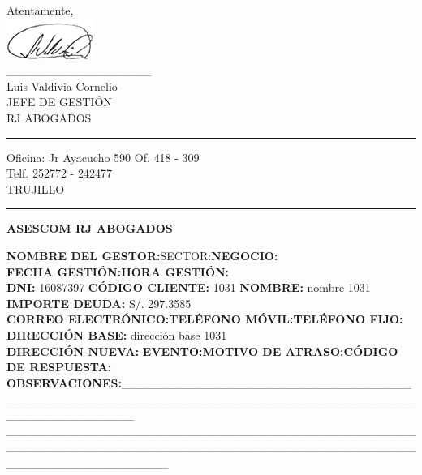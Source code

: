 \noindent Atentamente,\\
\includegraphics[natwidth=2.831041667cm, natheight=1.322916667cm]{resources/lawyer_signature.png}\\
\_\_\_\_\_\_\_\_\_\_\_\_\_\_\_\_\_\\
{\small Luis Valdivia Cornelio\\
JEFE DE GESTIÓN\\
RJ ABOGADOS}\\


\textcolor[rgb]{1.00,0.00,0.00}{\hrule}
\vspace{0.2cm}
{\noindent\footnotesize Oficina: Jr Ayacucho 590 Of. 418 - 309\\
Telf. 252772 - 242477\\
TRUJILLO}

\textcolor[rgb]{0.00,0.00,0.00}{\hrule}

\begin{center}
\textbf{\footnotesize ASESCOM RJ ABOGADOS}
\end{center}
{\noindent\footnotesize
\textbf{NOMBRE DEL GESTOR:}\hfill {SECTOR:}\hfill \textbf{NEGOCIO:}\\
\textbf{FECHA GESTIÓN:}\space\space\space\textbf{HORA GESTIÓN:}\\
\textbf{DNI:} 16087397 	\textbf{CÓDIGO CLIENTE:} 1031	\textbf{NOMBRE:} nombre 1031 	\textbf{IMPORTE DEUDA:} S/. 297.3585\\
\textbf{CORREO ELECTRÓNICO:}\space\space\space \textbf{TELÉFONO MÓVIL:}\space\space	\textbf{TELÉFONO FIJO:}\\
\textbf{DIRECCIÓN BASE:} dirección base 1031\\
\textbf{DIRECCIÓN NUEVA:} %
\textbf{EVENTO:}\space\space \textbf{MOTIVO DE ATRASO:}\space\space \textbf{CÓDIGO DE RESPUESTA:}\\
\textbf{OBSERVACIONES:}\_\_\_\_\_\_\_\_\_\_\_\_\_\_\_\_\_\_\_\_\_\_\_\_\_\_\_\_\_\_\_\_\_\_\_\_\_\_\_\_\_\_\_\_\_\_\_\_\_\_\_\_\_\_\_\_\_\_\_\_\_\_\_\_\_\_\_\_\_\_\_\_\_\_\_\_\_\_\_\_\_\_\_\_\_\_\_\_\_\_\_\_\_\_\_\_\_\\
\_\_\_\_\_\_\_\_\_\_\_\_\_\_\_\_\_\_\_\_\_\_\_\_\_\_\_\_\_\_\_\_\_\_\_\_\_\_\_\_\_\_\_\_\_\_\_\_\_\_\_\_\_\_\_\_\_\_\_\_\_\_\_\_\_\_\_\_\_\_\_\_\_\_\_\_\_\_\_\_\_\_\_\_\_\_\_\_\_\_\_\_\_\_\_\_\_\_\_\_\_\_\_\_\_\_\_\_\_\_\_\_\_\_\_
}







